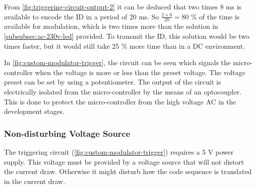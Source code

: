 	From \autoref{fig:triggering-circuit-output-2} it can be deduced that two times 8 ms is available to encode the ID in a period of 20 ms.
	So $\frac{2 \times 8}{20} = 80$ \% of the time is available for modulation, which is two times more than the solution in \autoref{subsubsec:ac-230v-led} provided.
	To transmit the ID, this solution would be two times faster, but it would still take 25 \% more time than in a DC environment.



	In \autoref{fig:custom-modulator-trigger}, the circuit can be seen which signals the micro-controller when the voltage is more or less than the preset voltage. 
	The voltage preset can be set by using a potentiometer.
	The output of the circuit is electrically isolated from the micro-controller by the means of an optocoupler.
	This is done to protect the micro-controller from the high voltage AC in the development stages.








	


	





	\subsubsection{Non-disturbing Voltage Source}
	\label{subsubsec:non-disturbing-voltage-source}

	The triggering circuit (\autoref{fig:custom-modulator-trigger}) requires a 5 V power supply.
	This voltage must be provided by a voltage source that will not distort the current draw.
	Otherwise it might disturb how the code sequence is translated in the current draw.

